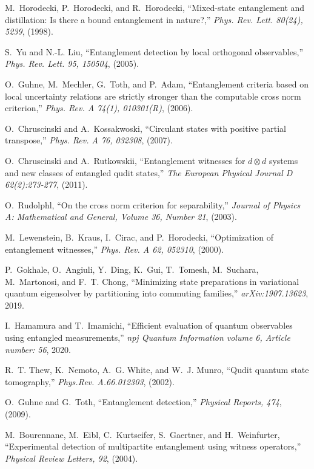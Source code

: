 \documentclass[%
 12pt,
 superscriptaddress,
 amsmath,
 amssymb,
 onecolumn,
 longbibliography
]{revtex4-2}
\begin{document}
\begin{thebibliography}{10}
M.~Horodecki, P.~Horodecki, and R.~Horodecki, ``Mixed-state entanglement and
  distillation: Is there a bound entanglement in nature?,'' {\em Phys. Rev.
  Lett. 80(24), 5239}, (1998).

S.~Yu and N.-L. Liu, ``Entanglement detection by local orthogonal
  observables,'' {\em Phys. Rev. Lett. 95, 150504}, (2005).

O.~Guhne, M.~Mechler, G.~Toth, and P.~Adam, ``Entanglement criteria based on
  local uncertainty relations are strictly stronger than the computable cross
  norm criterion,'' {\em Phys. Rev. A 74(1), 010301(R)}, (2006).

O.~Chruscinski and A.~Kossakwoski, ``Circulant states with positive partial
  transpose,'' {\em Phys. Rev. A 76, 032308}, (2007).

O.~Chruscinski and A.~Rutkowskii, ``Entanglement witnesses for $d\otimes d$
  systems and new classes of entangled qudit states,'' {\em The European
  Physical Journal D 62(2):273-277}, (2011).

O.~Rudolphl, ``On the cross norm criterion for separability,'' {\em Journal of
  Physics A: Mathematical and General, Volume 36, Number 21}, (2003).

M.~Lewenstein, B.~Kraus, I.~Cirac, and P.~Horodecki, ``Optimization of
  entanglement witnesses,'' {\em Phys. Rev. A 62, 052310}, (2000).

P.~Gokhale, O.~Angiuli, Y.~Ding, K.~Gui, T.~Tomesh, M.~Suchara, M.~Martonosi,
  and F.~T. Chong, ``Minimizing state preparations in variational quantum
  eigensolver by partitioning into commuting families,'' {\em
  arXiv:1907.13623}, 2019.

I.~Hamamura and T.~Imamichi, ``Efficient evaluation of quantum observables
  using entangled measurements,'' {\em npj Quantum Information volume 6,
  Article number: 56}, 2020.

R.~T. Thew, K.~Nemoto, A.~G. White, and W.~J. Munro, ``Qudit quantum state
  tomography,'' {\em Phys.Rev. A.66.012303}, (2002).

O.~Guhne and G.~Toth, ``Entanglement detection,'' {\em Physical Reports, 474},
  (2009).

M.~Bourennane, M.~Eibl, C.~Kurtseifer, S.~Gaertner, and H.~Weinfurter,
  ``Experimental detection of multipartite entanglement using witness
  operators,'' {\em Physical Review Letters, 92}, (2004).


\end{thebibliography}
\end{document}

